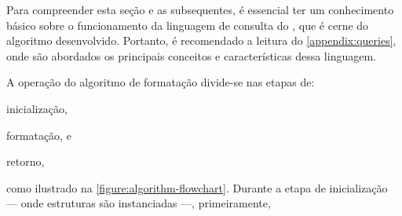 \documentclass
  [11pt,a4paper,english,brazil,openright,sumario=tradicional,twoside]
  {abntex2}
\begin{document}
  Para compreender esta seção e as subsequentes, é essencial ter um
  conhecimento básico sobre o funcionamento da linguagem de consulta do
  \treesitter, que é cerne do algoritmo desenvolvido. Portanto, é recomendado a
  leitura do \cref{appendix:queries}, onde são abordados os principais
  conceitos e características dessa linguagem.

  A operação do algoritmo de formatação divide-se nas etapas de:
  \begin{inparaenum}
    \item inicialização,
    \item formatação, e
    \item retorno,
  \end{inparaenum}
  como ilustrado na \cref{figure:algorithm-flowchart}. Durante a etapa de
  inicialização --- onde estruturas são instanciadas ---, primeiramente,
\end{document}
